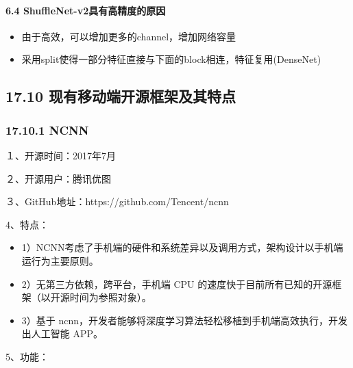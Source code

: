 \paragraph{6.4
ShuffleNet-v2具有高精度的原因}\label{shufflenet-v2ux5177ux6709ux9ad8ux7cbeux5ea6ux7684ux539fux56e0}

\begin{itemize}
\item
  由于高效，可以增加更多的channel，增加网络容量
\item
  采用split使得一部分特征直接与下面的block相连，特征复用(DenseNet)
\end{itemize}

\subsection{17.10
现有移动端开源框架及其特点}\label{ux73b0ux6709ux79fbux52a8ux7aefux5f00ux6e90ux6846ux67b6ux53caux5176ux7279ux70b9}

\subsubsection{17.10.1 NCNN}\label{ncnn}

１、开源时间：2017年7月　　　

２、开源用户：腾讯优图　　　　

３、GitHub地址：https://github.com/Tencent/ncnn 　　

4、特点：

\begin{itemize}
\item
  1）NCNN考虑了手机端的硬件和系统差异以及调用方式，架构设计以手机端运行为主要原则。
\item
  2）无第三方依赖，跨平台，手机端 CPU
  的速度快于目前所有已知的开源框架（以开源时间为参照对象）。
\item
  3）基于
  ncnn，开发者能够将深度学习算法轻松移植到手机端高效执行，开发出人工智能
  APP。
\end{itemize}

5、功能：

